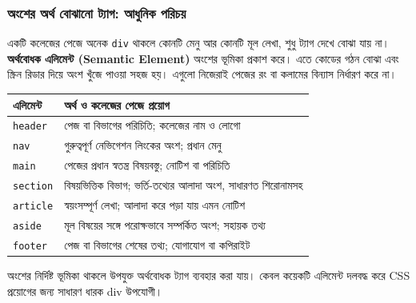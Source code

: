 \subsubsection{অংশের অর্থ বোঝানো ট্যাগ: আধুনিক পরিচয়}
একটি কলেজের পেজে অনেক \texttt{div} থাকলে কোনটি মেনু আর কোনটি মূল লেখা, শুধু ট্যাগ দেখে বোঝা যায় না। \textbf{অর্থবোধক এলিমেন্ট (Semantic Element)} অংশের ভূমিকা প্রকাশ করে। এতে কোডের গঠন বোঝা এবং স্ক্রিন রিডার দিয়ে অংশ খুঁজে পাওয়া সহজ হয়। এগুলো নিজেরাই পেজের রং বা কলামের বিন্যাস নির্ধারণ করে না।

\begin{tabular}{|p{.22\linewidth}|p{.68\linewidth}|}
\hline
\textbf{এলিমেন্ট} & \textbf{অর্থ ও কলেজের পেজে প্রয়োগ} \\
\hline
\texttt{header} & পেজ বা বিভাগের পরিচিতি; কলেজের নাম ও লোগো \\
\hline
\texttt{nav} & গুরুত্বপূর্ণ নেভিগেশন লিংকের অংশ; প্রধান মেনু \\
\hline
\texttt{main} & পেজের প্রধান স্বতন্ত্র বিষয়বস্তু; নোটিশ বা পরিচিতি \\
\hline
\texttt{section} & বিষয়ভিত্তিক বিভাগ; ভর্তি-তথ্যের আলাদা অংশ, সাধারণত শিরোনামসহ \\
\hline
\texttt{article} & স্বয়ংসম্পূর্ণ লেখা; আলাদা করে পড়া যায় এমন নোটিশ \\
\hline
\texttt{aside} & মূল বিষয়ের সঙ্গে পরোক্ষভাবে সম্পর্কিত অংশ; সহায়ক তথ্য \\
\hline
\texttt{footer} & পেজ বা বিভাগের শেষের তথ্য; যোগাযোগ বা কপিরাইট \\
\hline
\end{tabular}

অংশের নির্দিষ্ট ভূমিকা থাকলে উপযুক্ত অর্থবোধক ট্যাগ ব্যবহার করা যায়। কেবল কয়েকটি এলিমেন্ট দলবদ্ধ করে CSS প্রয়োগের জন্য সাধারণ ধারক div উপযোগী।

